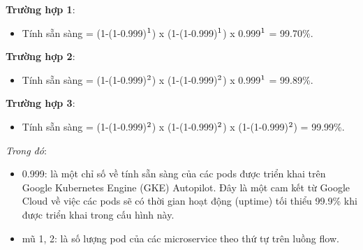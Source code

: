\textbf{Trường hợp 1}:
\begin{itemize}
    \item Tính sẵn sàng = (1-(1-0.999)$\sp{1}$) x (1-(1-0.999)$\sp{1}$) x 0.999$\sp{1}$ = 99.70\%.
\end{itemize}
\textbf{Trường hợp 2}:
\begin{itemize}
    \item Tính sẵn sàng = (1-(1-0.999)$\sp{2}$) x (1-(1-0.999)$\sp{2}$) x 0.999$\sp{1}$ = 99.89\%.
\end{itemize}
\textbf{Trường hợp 3}:
\begin{itemize}
    \item Tính sẵn sàng = (1-(1-0.999)$\sp{2}$) x (1-(1-0.999)$\sp{2}$) x (1-(1-0.999)$\sp{2}$) = 99.99\%.
\end{itemize}
\textit{Trong đó}:
\begin{itemize}
    \item 0.999: là một chỉ số về tính sẵn sàng của các pods được triển khai trên Google Kubernetes Engine (GKE) Autopilot. Đây là một cam kết từ Google Cloud về việc các pods sẽ có thời gian hoạt động (uptime) tối thiểu 99.9\% khi được triển khai trong cấu hình này.
    \item mũ 1, 2: là số lượng pod của các microservice theo thứ tự trên luồng flow.
\end{itemize}

